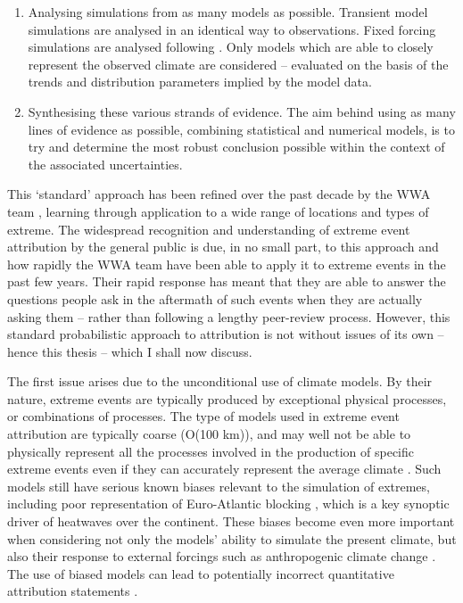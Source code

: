 \begin{enumerate}
      \item Analysing simulations from as many models as possible. Transient model simulations are analysed in an identical way to observations. Fixed forcing simulations are analysed following \citet{pall_anthropogenic_2011}. Only models which are able to closely represent the observed climate are considered -- evaluated on the basis of the trends and distribution parameters implied by the model data.
      \item Synthesising these various strands of evidence. The aim behind using as many lines of evidence as possible, combining statistical and numerical models, is to try and determine the most robust conclusion possible within the context of the associated uncertainties. 
    \end{enumerate}
    This `standard' approach has been refined over the past decade by the WWA team \citep{van_oldenborgh_pathways_2021}, learning through application to a wide range of locations and types of extreme. The widespread recognition and understanding of extreme event attribution by the general public is due, in no small part, to this approach and how rapidly the WWA team have been able to apply it to extreme events in the past few years. Their rapid response has meant that they are able to answer the questions people ask in the aftermath of such events when they are actually asking them -- rather than following a lengthy peer-review process. However, this standard probabilistic approach to attribution is not without issues of its own -- hence this thesis -- which I shall now discuss.

    The first issue arises due to the unconditional use of climate models. By their nature, extreme events are typically produced by exceptional physical processes, or combinations of processes. The type of models used in extreme event attribution are typically coarse (O(100 km)), and may well not be able to physically represent all the processes involved in the production of specific extreme events even if they can accurately represent the average climate \citep{sillmann_understanding_2017,trenberth_attribution_2015,demory_role_2014}. Such models still have serious known biases relevant to the simulation of extremes, including poor representation of Euro-Atlantic blocking \citep{schiemann_resolution_2017,dorrington_how_2021}, which is a key synoptic driver of heatwaves over the continent. These biases become even more important when considering not only the models' ability to simulate the present climate, but also their response to external forcings such as anthropogenic climate change \citep{palmer_nonlinear_1999,palmer_simple_2018}. The use of biased models can lead to potentially incorrect quantitative attribution statements \citep{bellprat_attribution_2016,bellprat_towards_2019}. 
    
